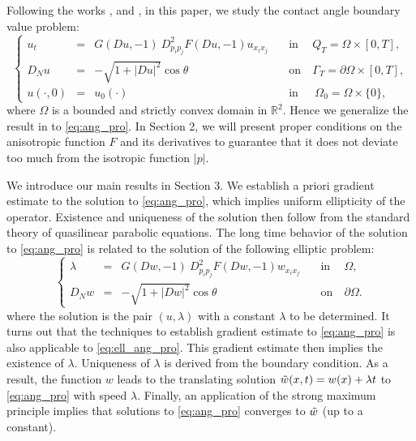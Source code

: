\documentclass[12pt]{article}
\numberwithin{equation}{section}
\theoremstyle{plain}
\theoremstyle{definition}
\theoremstyle{remark}
\begin{document}
Following the works \cite{Hu1}, \cite{AW1} and \cite{AW2}, in this paper, we study the contact angle boundary value problem:
\begin{equation} \label{eq:ang_pro}
    \left\{ \begin{array}{cllcl}
            u_t  &=& G(Du,-1) \  D^2_{p_i p_j} F (Du,-1) u_{x_i x_j}   \quad &  \text{in} & \ Q_T = \Omega \times [0,T], \\
            D_N u &=& - \sqrt{1+|Du|^2} \cos \theta  \quad &  \text{on} & \ \Gamma_T = \partial \Omega \times [0,T],  \\
         u(\cdot,0) &=& u_0(\cdot)  \quad \ & \text{in} & \ \  \Omega_0 = \Omega \times \{0\},
    \end{array}  \right.
\end{equation}
where $\Omega$ is a bounded and strictly convex domain in $\mathbb{R}^{2}$. 
Hence we generalize the result in \cite{AW2} to \eqref{eq:ang_pro}. In Section 2, we will present proper conditions  on the anisotropic function $F$ and its derivatives to guarantee that it does not deviate too much from the isotropic function $|p|$. 

We introduce our main results in Section 3. We establish a priori gradient estimate to the solution to \eqref{eq:ang_pro}, which implies uniform ellipticity of the operator. Existence and uniqueness of the solution then follow from the standard theory of quasilinear parabolic equations. The long time behavior of the solution to \eqref{eq:ang_pro} is related to the solution of the following elliptic problem: 
\begin{equation} \label{eq:ell_ang_pro}
\left\{ \begin{array}{cllcl}
     \lambda & = & G (Dw,-1) \ D^2_{p_i p_j} F (Dw,-1) w_{x_i x_j}   \quad & \text{in} & \ \Omega,  \\
     D_N w & = & - \sqrt{1+|Dw|^2} \cos \theta \quad & \text{on} & \ \partial \Omega. 
\end{array} \right.
\end{equation}
where the solution is the pair $(u,\lambda)$ with a constant $\lambda$ to be determined.
It turns out that the techniques to establish gradient estimate to \eqref{eq:ang_pro} is also applicable to \eqref{eq:ell_ang_pro}. This gradient estimate then implies the existence of $\lambda$. Uniqueness of $\lambda$ is derived from the boundary condition. As a result, the function $w$ leads to the translating solution $\Tilde{w}(x,t) = w(x) + \lambda t$ to \eqref{eq:ang_pro} with speed $\lambda$. Finally, an application of the strong maximum principle implies that solutions to \eqref{eq:ang_pro} converges to $\Tilde{w}$ (up to a constant).
\end{document}
